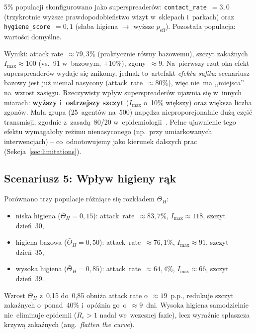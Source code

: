\documentclass[polish]{projectreport}
\begin{document}
5\% populacji skonfigurowano jako superspreaderów:
\texttt{contact\_rate}~$= 3{,}0$ (trzykrotnie wyższe
prawdopodobieństwo wizyt w~sklepach i~parkach) oraz
\texttt{hygiene\_score}~$= 0{,}1$ (słaba higiena $\to$ wyższe
$p_{\text{eff}}$). Pozostała populacja: wartości domyślne.

Wyniki: attack rate~$\approx 79{,}3\%$ (praktycznie równy bazowemu),
szczyt zakaźnych $I_{\max} \approx 100$ (vs.\ 91 w~bazowym, $+10\%$),
zgony~$\approx 9$. Na~pierwszy rzut oka efekt superspreaderów wydaje się
znikomy, jednak to~artefakt \emph{efektu sufitu}: scenariusz bazowy jest
już niemal nasycony (attack~rate~$\approx 80\%$), więc nie~ma ,,miejsca''
na~wzrost zasięgu. Rzeczywisty wpływ superspreaderów ujawnia się w~innych
miarach: \textbf{wyższy i~ostrzejszy szczyt} ($I_{\max}$ o~10\% większy)
oraz większa liczba zgonów. Mała grupa (25~agentów na~500) napędza
nieproporcjonalnie dużą część transmisji, zgodnie z~zasadą~80/20
w~epidemiologii~\cite{lloyd2001realistic}. Pełne ujawnienie tego efektu
wymagałoby reżimu nienasyconego (np.\ przy umiarkowanych interwencjach)
-- co~odnotowujemy jako kierunek dalszych prac (Sekcja~\ref{sec:limitations}).

\subsection{Scenariusz 5: Wpływ higieny rąk}
\label{sec:sc-hygiene}

Porównano trzy populacje różniące się rozkładem $\Theta_H$:

\begin{itemize}
  \item niska higiena ($\bar{\Theta}_H = 0{,}15$): attack~rate~$\approx 83{,}7\%$,
        $I_{\max} \approx 118$, szczyt dzień~30,
  \item higiena bazowa ($\bar{\Theta}_H = 0{,}50$): attack~rate~$\approx 76{,}1\%$,
        $I_{\max} \approx 91$, szczyt dzień~35,
  \item wysoka higiena ($\bar{\Theta}_H = 0{,}85$): attack~rate~$\approx 64{,}4\%$,
        $I_{\max} \approx 66$, szczyt dzień~39.
\end{itemize}

Wzrost $\bar{\Theta}_H$ z~0,15 do~0,85 obniża attack rate
o~$\approx 19$~p.p., redukuje szczyt zakaźnych o~ponad~40\%
i~opóźnia go~o~$\approx 9$~dni. Wysoka higiena samodzielnie
nie~eliminuje epidemii ($R_e > 1$ nadal we~wczesnej fazie),
lecz wyraźnie spłaszcza krzywą zakaźnych (ang.\ \textit{flatten the curve}).
\end{document}

